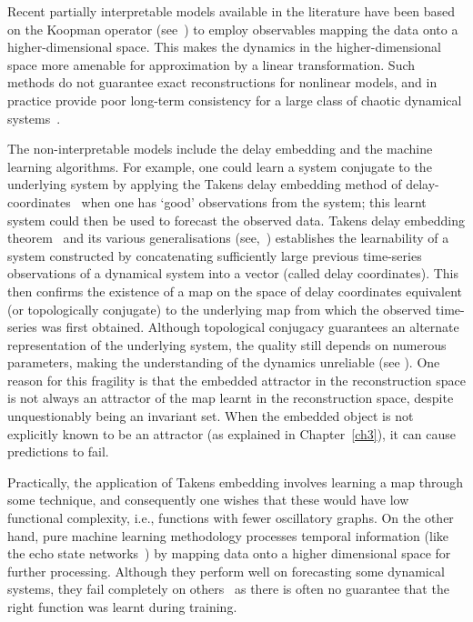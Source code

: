 Recent partially interpretable models available in the literature have been based on the Koopman operator (see~\cite{koopman1932dynamical,budivsic2012applied}) to employ observables mapping the data onto a higher-dimensional space. This makes the dynamics in the higher-dimensional space more amenable for approximation by a linear transformation. Such methods do not guarantee exact reconstructions for nonlinear models, and in practice provide poor long-term consistency for a large class of chaotic dynamical systems~\cite{Supp}.

The non-interpretable models include the delay embedding and the machine learning algorithms. For example, one could learn a system conjugate to the underlying system by applying the Takens delay embedding method of delay-coordinates~\cite{takens1981detecting} when one has `good' observations from the system; this learnt system could then be used to forecast the observed data. 
Takens delay embedding theorem~\cite{takens1981detecting} and its various generalisations (see,~\cite{sauer1991embedology, stark1999delay, gutman2018embedding}) establishes the learnability of a system constructed by concatenating sufficiently large previous time-series observations of a dynamical system into a vector (called delay coordinates). This then confirms the existence of a map on the space of delay coordinates equivalent (or topologically conjugate) to the underlying map from which the observed time-series was first obtained. Although topological conjugacy guarantees an alternate representation of the underlying system, the quality still depends on numerous parameters, making the understanding of the dynamics unreliable (see \cite{principe1992prediction}). One reason for this fragility is that the embedded attractor in the reconstruction space is not always an attractor of the map learnt in the reconstruction space, despite unquestionably being an invariant set. When the embedded object is not explicitly known to be an attractor (as explained in Chapter~\ref{ch3}), it can cause predictions to fail.

Practically, the application of Takens embedding involves learning a map through some technique, and consequently one wishes that these would have low functional complexity\cite{manjunath2021universal}, i.e., functions with fewer oscillatory graphs. On the other hand, pure machine learning methodology processes temporal information (like the echo state networks~\cite{Manju_ESP, Manju_IEEE, grigoryeva2018echo}) by mapping data onto a higher dimensional space for further processing. Although they perform  well on forecasting some dynamical systems, they fail completely on others~\cite{Supp} as there is often no guarantee that the right function was learnt during training.

